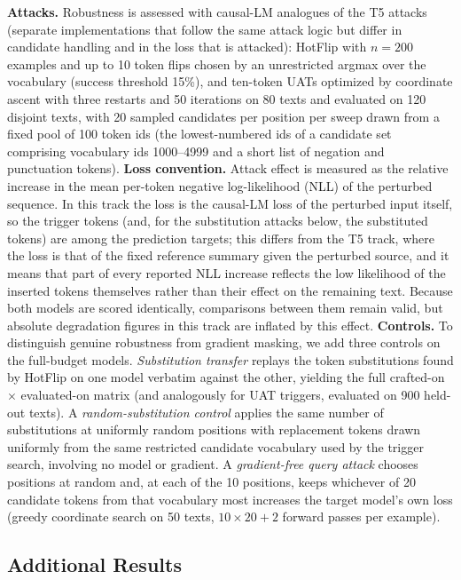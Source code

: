 \documentclass{article}
\theoremstyle{plain}
\theoremstyle{definition}
\theoremstyle{remark}
\theoremstyle{plain}
\begin{document}
\textbf{Attacks.} Robustness is assessed with causal-LM analogues of the T5 attacks (separate implementations that follow the same attack logic but differ in candidate handling and in the loss that is attacked): HotFlip with $n = 200$ examples and up to 10 token flips chosen by an unrestricted argmax over the vocabulary (success threshold 15\%), and ten-token UATs optimized by coordinate ascent with three restarts and 50 iterations on 80 texts and evaluated on 120 disjoint texts, with 20 sampled candidates per position per sweep drawn from a fixed pool of 100 token ids (the lowest-numbered ids of a candidate set comprising vocabulary ids 1000--4999 and a short list of negation and punctuation tokens).
\textbf{Loss convention.} Attack effect is measured as the relative increase in the mean per-token negative log-likelihood (NLL) of the perturbed sequence.
In this track the loss is the causal-LM loss of the perturbed input itself, so the trigger tokens (and, for the substitution attacks below, the substituted tokens) are among the prediction targets; this differs from the T5 track, where the loss is that of the fixed reference summary given the perturbed source, and it means that part of every reported NLL increase reflects the low likelihood of the inserted tokens themselves rather than their effect on the remaining text. Because both models are scored identically, comparisons between them remain valid, but absolute degradation figures in this track are inflated by this effect.
\textbf{Controls.} To distinguish genuine robustness from gradient masking, we add three controls on the full-budget models. \emph{Substitution transfer} replays the token substitutions found by HotFlip on one model verbatim against the other, yielding the full crafted-on $\times$ evaluated-on matrix (and analogously for UAT triggers, evaluated on 900 held-out texts). A \emph{random-substitution control} applies the same number of substitutions at uniformly random positions with replacement tokens drawn uniformly from the same restricted candidate vocabulary used by the trigger search, involving no model or gradient. A \emph{gradient-free query attack} chooses positions at random and, at each of the 10 positions, keeps whichever of 20 candidate tokens from that vocabulary most increases the target model's own loss (greedy coordinate search on 50 texts, $10\times 20 + 2$ forward passes per example).



\subsection{Additional Results}
\label{app:more-results}
\end{document}
